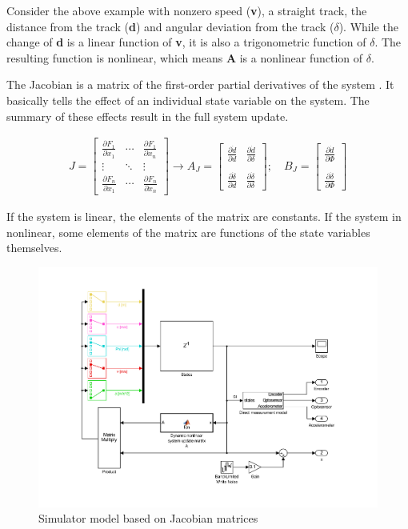Consider the above example with nonzero speed (\textbf{v}), a straight track, the distance from the track (\textbf{d}) and angular deviation from the track ($\delta$). While the change of \textbf{d} is a linear function of \textbf{v}, it is also a trigonometric function of $\delta$. The resulting function is nonlinear, which means \textbf{A} is a nonlinear function of $\delta$. 

The Jacobian is a matrix of the first-order partial derivatives of the system \cite[p. 294]{jacobian}. It basically tells the effect of an individual state variable on the system. The summary of these effects result in the full system update.

\begin{align}
J =
		 \begin{bmatrix}
		  \frac{\partial F_1}{\partial x_1} & \cdots & \frac{\partial F_1}{\partial x_n} \\
		  \vdots  & \ddots & \vdots  \\
		  \frac{\partial F_n}{\partial x_1} & \cdots & \frac{\partial F_n}{\partial x_n}
		 \end{bmatrix}
\longrightarrow
 A_J =
		 \begin{bmatrix}
           \frac{\partial \dot{d}}{\partial d} & \frac{\partial \dot{d}}{\partial \delta} \\
           & \\
           \frac{\partial \dot{\delta}}{\partial d} & \frac{\partial \dot{\delta}}{\partial \delta}
         \end{bmatrix}
; \quad
B_J =
         \begin{bmatrix}
               \frac{\partial \dot{d}}{\partial \Phi} \\
               \\
               \frac{\partial \dot{\delta}}{\partial \Phi}
         \end{bmatrix}
\end{align}

If the system is linear, the elements of the matrix are constants. If the system in nonlinear, some elements of the matrix are functions of the state variables themselves.

\begin{figure}[!ht]
    \centering
    \includegraphics[width=0.7\linewidth]{img/sys}
    \centering
    \vspace{-20pt}
    \caption{Simulator model based on Jacobian matrices}
    \label{fig:model}
\end{figure}

